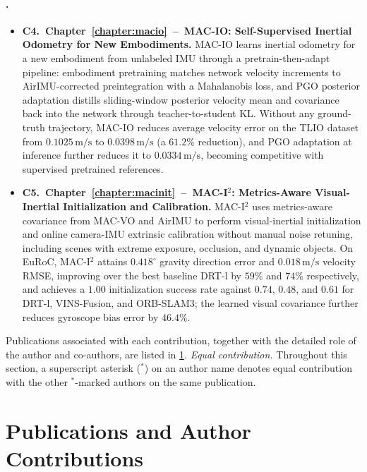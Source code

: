\paragraph{\partIIITitle.}
\begin{itemize}
    \item \textbf{C4.~Chapter~\ref{chapter:macio}~--~MAC-IO: Self-Supervised Inertial Odometry for New Embodiments.}
    MAC-IO learns inertial odometry for a new embodiment from unlabeled IMU through a pretrain-then-adapt pipeline: embodiment pretraining matches network velocity increments to AirIMU-corrected preintegration with a Mahalanobis loss, and PGO posterior adaptation distills sliding-window posterior velocity mean and covariance back into the network through teacher-to-student KL.
    Without any ground-truth trajectory, MAC-IO reduces average velocity error on the TLIO dataset from $0.1025\,\mathrm{m/s}$ to $0.0398\,\mathrm{m/s}$ (a $61.2\%$ reduction), and PGO adaptation at inference further reduces it to $0.0334\,\mathrm{m/s}$, becoming competitive with supervised pretrained references.

    \item \textbf{C5.~Chapter~\ref{chapter:macinit}~--~MAC-I$^2$: Metrics-Aware Visual-Inertial Initialization and Calibration.}
    MAC-I$^2$ uses metrics-aware covariance from MAC-VO and AirIMU to perform visual-inertial initialization and online camera-IMU extrinsic calibration without manual noise retuning, including scenes with extreme exposure, occlusion, and dynamic objects.
    On EuRoC, MAC-I$^2$ attains $0.418^{\circ}$ gravity direction error and $0.018\,\mathrm{m/s}$ velocity RMSE, improving over the best baseline DRT-l by $59\%$ and $74\%$ respectively, and achieves a $1.00$ initialization success rate against $0.74$, $0.48$, and $0.61$ for DRT-l, VINS-Fusion, and ORB-SLAM3; the learned visual covariance further reduces gyroscope bias error by $46.4\%$.

\end{itemize}

Publications associated with each contribution, together with the detailed role of the author and co-authors, are listed in \cref{sec:publications}. \noindent\textit{Equal contribution.} Throughout this section, a superscript asterisk ($^*$) on an author name denotes equal contribution with the other $^*$-marked authors on the same publication.


\section{Publications and Author Contributions}
\label{sec:publications}

